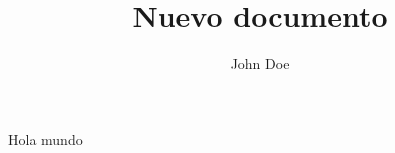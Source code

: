\documentclass{article}
\author{John Doe}
\title{Nuevo documento}
\begin{document}
Hola mundo
\end{document}
